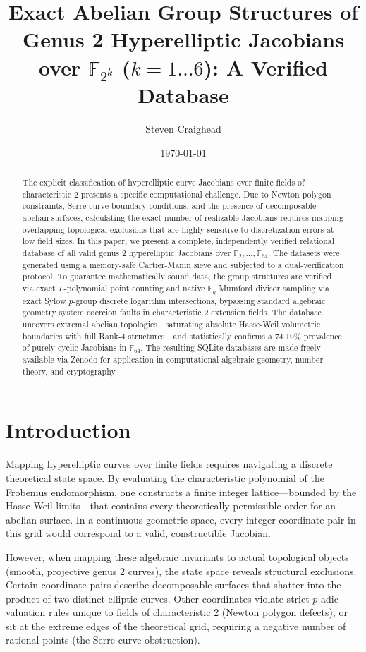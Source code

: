 \documentclass[letterpaper, 11pt]{article}
\title{Exact Abelian Group Structures of Genus 2 Hyperelliptic Jacobians over \texorpdfstring{$\mathbb{F}_{2^k}$}{F\_2\textasciicircum k} (\texorpdfstring{$k=1 \dots 6$}{k=1..6}): A Verified Database}
\author{Steven Craighead}
\date{\today}
\begin{document}
\maketitle

\begin{abstract}
The explicit classification of hyperelliptic curve Jacobians over finite fields of characteristic 2 presents a specific computational challenge. Due to Newton polygon constraints, Serre curve boundary conditions, and the presence of decomposable abelian surfaces, calculating the exact number of realizable Jacobians requires mapping overlapping topological exclusions that are highly sensitive to discretization errors at low field sizes. In this paper, we present a complete, independently verified relational database of all valid genus 2 hyperelliptic Jacobians over $\mathbb{F}_2, \dots, \mathbb{F}_{64}$. The datasets were generated using a memory-safe Cartier-Manin sieve and subjected to a dual-verification protocol. To guarantee mathematically sound data, the group structures are verified via exact $L$-polynomial point counting and native $\mathbb{F}_q$ Mumford divisor sampling via exact Sylow $p$-group discrete logarithm intersections, bypassing standard algebraic geometry system coercion faults in characteristic 2 extension fields. The database uncovers extremal abelian topologies—saturating absolute Hasse-Weil volumetric boundaries with full Rank-4 structures—and statistically confirms a 74.19\% prevalence of purely cyclic Jacobians in $\mathbb{F}_{64}$. The resulting SQLite databases are made freely available via Zenodo for application in computational algebraic geometry, number theory, and cryptography.
\end{abstract}

\section{Introduction}
Mapping hyperelliptic curves over finite fields requires navigating a discrete theoretical state space. By evaluating the characteristic polynomial of the Frobenius endomorphism, one constructs a finite integer lattice---bounded by the Hasse-Weil limits---that contains every theoretically permissible order for an abelian surface. In a continuous geometric space, every integer coordinate pair in this grid would correspond to a valid, constructible Jacobian.

However, when mapping these algebraic invariants to actual topological objects (smooth, projective genus 2 curves), the state space reveals structural exclusions. Certain coordinate pairs describe decomposable surfaces that shatter into the product of two distinct elliptic curves. Other coordinates violate strict $p$-adic valuation rules unique to fields of characteristic 2 (Newton polygon defects), or sit at the extreme edges of the theoretical grid, requiring a negative number of rational points (the Serre curve obstruction).
\end{document}
